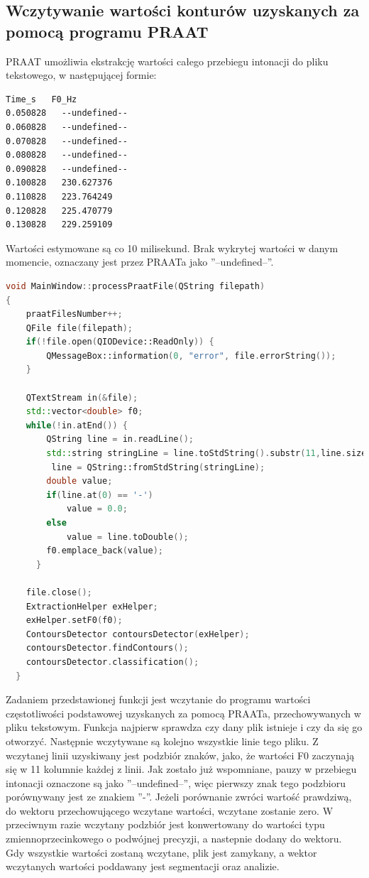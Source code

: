 \documentclass[a4paper,12 pt]{article}
\begin{document}
\subsection{Wczytywanie wartości konturów uzyskanych za pomocą programu PRAAT}
PRAAT umożliwia ekstrakcję wartości całego przebiegu intonacji do pliku tekstowego, w następującej formie:
\begin{lstlisting}
Time_s   F0_Hz
0.050828   --undefined--
0.060828   --undefined--
0.070828   --undefined--
0.080828   --undefined--
0.090828   --undefined--
0.100828   230.627376
0.110828   223.764249
0.120828   225.470779
0.130828   229.259109
\end{lstlisting}
Wartości estymowane są co 10 milisekund. Brak wykrytej wartości w danym momencie, oznaczany jest przez PRAATa jako ''--undefined--''.
\begin{lstlisting}[caption={Funkcja wczytująca do programu wartości F0 z pliku tekstowego},label={lst:label},language=C++]
void MainWindow::processPraatFile(QString filepath)
{
    praatFilesNumber++;
    QFile file(filepath);
    if(!file.open(QIODevice::ReadOnly)) {
        QMessageBox::information(0, "error", file.errorString());
    }

    QTextStream in(&file);
    std::vector<double> f0;
    while(!in.atEnd()) {
        QString line = in.readLine();
        std::string stringLine = line.toStdString().substr(11,line.size());
         line = QString::fromStdString(stringLine);
        double value;
        if(line.at(0) == '-')
            value = 0.0;
        else
            value = line.toDouble();
        f0.emplace_back(value);
      }

    file.close();
    ExtractionHelper exHelper;
    exHelper.setF0(f0);
    ContoursDetector contoursDetector(exHelper);
    contoursDetector.findContours();
    contoursDetector.classification();
  }
\end{lstlisting}
Zadaniem przedstawionej funkcji jest wczytanie do programu wartości częstotliwości podstawowej uzyskanych za pomocą PRAATa, przechowywanych w pliku tekstowym. Funkcja najpierw sprawdza czy dany plik istnieje i czy da się go otworzyć. Następnie wczytywane są kolejno wszystkie linie tego pliku. Z wczytanej linii uzyskiwany jest podzbiór znaków, jako, że wartości F0 zaczynają się w 11 kolumnie każdej z linii. Jak zostało już wspomniane, pauzy w przebiegu intonacji oznaczone są jako ''--undefined--'', więc pierwszy znak tego podzbioru porównywany jest ze znakiem ''-''. Jeżeli porównanie zwróci wartość prawdziwą, do wektoru przechowującego wczytane wartości, wczytane zostanie zero. W przeciwnym razie wczytany podzbiór jest konwertowany do wartości typu zmiennoprzecinkowego o podwójnej precyzji, a nastepnie dodany do wektoru. Gdy wszystkie wartości zostaną wczytane, plik jest zamykany, a wektor wczytanych wartości poddawany jest segmentacji oraz analizie.
\end{document}
